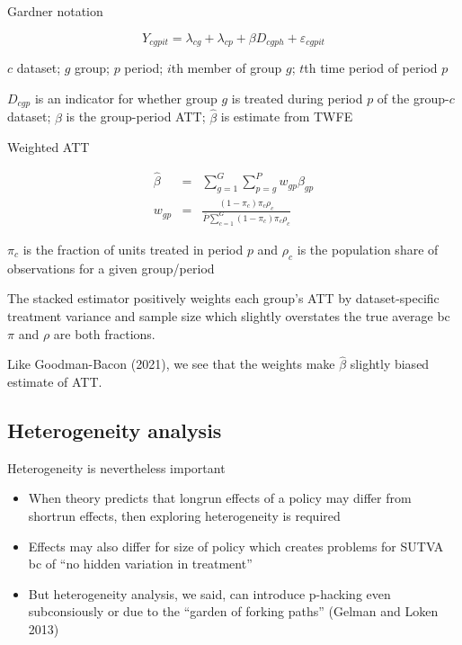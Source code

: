 \documentclass{beamer}
\begin{document}
\begin{frame}{Gardner notation}

\begin{equation}
Y_{cgpit} = \lambda_{cg} + \lambda_{cp} + \beta D_{cgph} + \varepsilon_{cgpit}
\end{equation}

\bigskip

$c$ dataset; $g$ group; $p$ period; $i$th member of group $g$; $t$th time period of period $p$

\bigskip

$D_{cgp}$ is an indicator for whether group $g$ is treated during period $p$ of the group-$c$ dataset; $\beta$ is the group-period ATT; $\widehat{\beta}$ is estimate from TWFE

\end{frame}

\begin{frame}{Weighted ATT}

\begin{eqnarray*}
\widehat{\beta} &=& \sum_{g=1}^G \sum_{p=g}^P w_{gp} \beta_{gp} \\
w_{gp} &=& \frac{(1-\pi_c) \pi_c \rho_c}{\overline{P} \sum_{c=1}^G (1-\pi_c) \pi_c \rho_c}
\end{eqnarray*}

{\small
\bigskip

$\pi_c$ is the fraction of units treated in period $p$ and $\rho_c$ is the population share of observations for a given group/period

\bigskip

The stacked estimator positively weights each group's ATT by dataset-specific treatment variance and sample size which slightly overstates the true average bc $\pi$ and $\rho$ are both fractions.

\bigskip

Like Goodman-Bacon (2021), we see that the weights make $\widehat{\beta}$ slightly biased estimate of ATT. 
}

\end{frame}

\subsection{Heterogeneity analysis}




\begin{frame}{Heterogeneity is nevertheless important}

\begin{itemize}
\item When theory predicts that longrun effects of a policy may differ from shortrun effects, then exploring heterogeneity is required
\item Effects may also differ for size of policy which creates problems for SUTVA bc of ``no hidden variation in treatment''
\item But heterogeneity analysis, we said, can introduce p-hacking even subconsiously or due to the ``garden of forking paths'' (Gelman and Loken 2013)
\end{itemize}

\end{frame}
\end{document}
